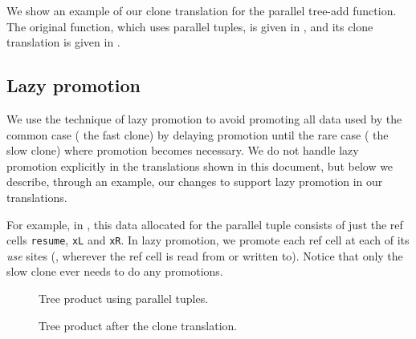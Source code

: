 \documentclass[11pt]{article}
\begin{document}
We show an example of our clone translation for the parallel tree-add function.
The original function, which uses parallel tuples, is given in ,
and its clone translation is given in .

\subsection{Lazy promotion}
We use the technique of lazy promotion to avoid promoting all data used by the common case
(\eg{} the fast clone) by delaying promotion until the rare case (\eg{} the slow clone)
where promotion becomes necessary.
We do not handle lazy promotion explicitly in the translations shown in this document,
but below we describe, through an example, our changes to support lazy promotion
in our translations.

For example, in , this data allocated for the parallel tuple 
consists of just the ref cells \texttt{resume}, \texttt{xL} and \texttt{xR}.
In lazy promotion, we promote each ref cell at each of its \emph{use} sites (\eg{}, wherever
the ref cell is read from or written to).
Notice that only the slow clone ever needs to do any promotions.

\begin{figure}
  
  \caption{Tree product using parallel tuples.}
  \label{fig:tree-prod-ptup}
\end{figure}

\begin{figure}
  
  \caption{Tree product after the clone translation.}
  \label{fig:tree-prod-clone}
\end{figure}
\end{document}
